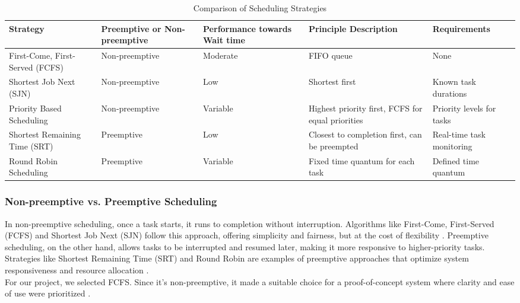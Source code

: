 \documentclass{article}
\begin{document}
\begin{table}[h!]
\centering
\begin{tabularx}{\textwidth}{|>{\centering\arraybackslash}m{2.5cm}|>{\centering\arraybackslash}m{2.93cm}|>{\centering\arraybackslash}m{2.9cm}|>{\centering\arraybackslash}m{2.9cm}|>{\centering\arraybackslash}m{2.5cm}|}
    \hline
    \textbf{Strategy} &
    \textbf{Preemptive or Non-preemptive} &
    \textbf{Performance towards Wait time} &
    \textbf{Principle Description} &
    \textbf{Requirements} \tabularnewline
    \hline
    First-Come, First-Served (FCFS) & Non-preemptive & Moderate & FIFO queue & None \tabularnewline
    \hline
    Shortest Job Next (SJN) & Non-preemptive & Low & Shortest first & Known task durations \tabularnewline
    \hline
    Priority Based Scheduling & Non-preemptive & Variable & Highest priority first, FCFS for equal priorities & Priority levels for tasks \tabularnewline
    \hline
    Shortest Remaining Time (SRT) & Preemptive & Low & Closest to completion first, can be preempted & Real-time task monitoring \tabularnewline
    \hline
    Round Robin Scheduling & Preemptive & Variable & Fixed time quantum for each task & Defined time quantum \tabularnewline
    \hline
\end{tabularx}
\caption{Comparison of Scheduling Strategies}
\end{table}

\subsubsection{Non-preemptive vs. Preemptive Scheduling}
In non-preemptive scheduling, once a task starts, it runs to completion without interruption. Algorithms like First-Come, First-Served (FCFS) and Shortest Job Next (SJN) follow this approach, offering simplicity and fairness, but at the cost of flexibility \cite{Tyagi & Gupta, 2018}. Preemptive scheduling, on the other hand, allows tasks to be interrupted and resumed later, making it more responsive to higher-priority tasks. Strategies like Shortest Remaining Time (SRT) and Round Robin are examples of preemptive approaches that optimize system responsiveness and resource allocation \cite{Jalali et al., 2024}.\\

For our project, we selected FCFS. Since it's non-preemptive, it made a suitable choice for a proof-of-concept system where clarity and ease of use were prioritized \cite{Tyagi & Gupta, 2018}.
\end{document}
